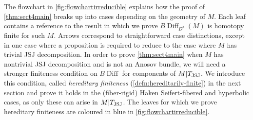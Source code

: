 \documentclass{amsart}
\theoremstyle{plain}
\theoremstyle{definition}
\DeclareMathOperator\Diff{Diff}
\DeclareMathOperator{\JSJ}{JSJ}
\newcommand{\ca}{\smash{\mid}} %
\newcommand{\BDiff}{B\!\Diff}
\begin{document}
The flowchart in \cref{fig:flowchartirreducible} explains how the proof of \cref{thm:sect4main} breaks up into cases depending on the geometry of $M$. Each leaf contains a reference to the result in which we prove $\BDiff_{D^3}(M)$ is homotopy finite for such $M$. Arrows correspond to straightforward case distinctions, except in one case where a proposition is required to reduce to the case where $M$ has trivial JSJ decomposition. In order to prove \cref{thm:sect4main} when $M$ has nontrivial JSJ decomposition and is not an Anosov bundle, we will need a stronger finiteness condition on $\BDiff$ for components of $M\ca T_{\JSJ}$. We introduce this condition, called \emph{hereditary finiteness} (\cref{defn:hereditarily-finite}) in the next section and prove it holds in the (fiber-rigid) Haken Seifert-fibered and hyperbolic cases, as only these can arise in $M\ca T_{\JSJ}$. The leaves for which we prove hereditary finiteness are coloured in blue in \cref{fig:flowchartirreducible}.
\end{document}
